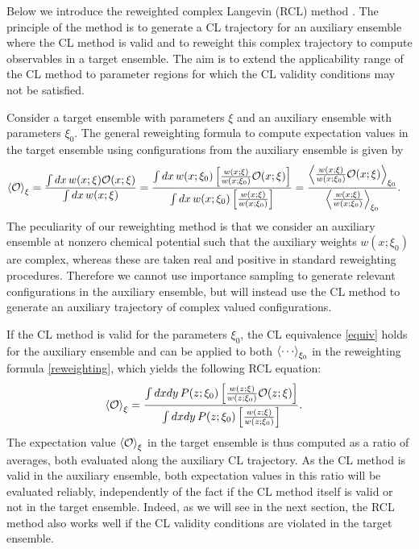 \documentclass{PoS}
\newcommand{\Obs}{{\cal O}}
\newcommand{\parset}{\xi}
\begin{document}
Below we introduce the reweighted complex Langevin (RCL) method \cite{Bloch2016}. The principle of the method is to generate a CL trajectory for an auxiliary ensemble where the CL method is valid and to reweight this complex trajectory to compute observables in a target ensemble. The aim is to extend the applicability range of the CL method to parameter regions for which the CL validity conditions may not be satisfied.


Consider a target ensemble with parameters $\parset$ and an auxiliary ensemble with parameters $\parset_0$. The general reweighting formula to compute expectation values in the target ensemble using configurations from the auxiliary ensemble is given by
\begin{align}
\braket{\Obs}_{\parset} &= \frac{\int dx \, w(x;\parset) \Obs(x;\parset)}{\int dx \,w(x;\parset)} 
= \frac{\int dx \, w(x;\parset_0) \left[\frac{w(x;\parset)}{w(x;\parset_0)}\Obs(x;\parset)\right]}{\int dx \,w(x;\parset_0) \left[\frac{w(x;\parset)}{w(x;\parset_0)}\right]} 
= \frac{\Braket{\frac{w(x;\parset)}{w(x;\parset_0)}\Obs(x;{\parset})}_{\parset_0}}{\Braket{\frac{w(x;\parset)}{w(x;\parset_0)}}_{\parset_0}} .
\label{reweighting}
\end{align}
The peculiarity of our reweighting method is that we consider an auxiliary ensemble at nonzero chemical potential such that the auxiliary weights $w(x;\parset_0)$ are complex, whereas these are taken real and positive in standard reweighting procedures. 
Therefore we cannot use importance sampling to generate relevant configurations in the auxiliary ensemble, but will instead use the CL method to generate an auxiliary trajectory of complex valued configurations.

If the CL method is valid for the parameters $\parset_0$, the CL equivalence \eqref{equiv} holds for the auxiliary ensemble and can be applied to both $\Braket{\cdots}_{\parset_0}$ in the reweighting formula \eqref{reweighting}, which yields the following RCL equation:
\begin{align}
\braket{\Obs}_{\parset} 
&= \frac{\int dx dy \,  P(z;\parset_0) \left[\frac{w(z;\parset)}{w(z;\parset_0)}\Obs(z;\parset)\right]}{\int dx dy \, P(z;\parset_0) \left[\frac{w(z;\parset)}{w(z;\parset_0)}\right]} .
\label{RCL}
\end{align}
The expectation value $\braket{\Obs}_{\parset}$ in the target ensemble is thus computed as a ratio of averages, both evaluated along the auxiliary CL trajectory. 
As the CL method is valid in the auxiliary ensemble,  both expectation values in this ratio will be  evaluated reliably, independently of the fact if the CL method itself is valid or not in the target ensemble. Indeed, as we will see in the next section, the RCL method also works well if the CL validity conditions are violated in the target ensemble.
\end{document}
